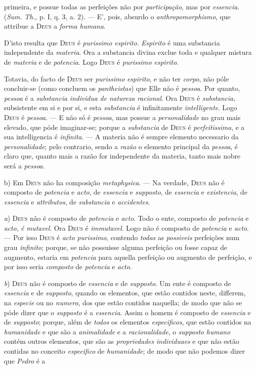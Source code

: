 primeira, e possue todas as perfeições não por \emph{participação}, mas por \emph{essencia}. (\emph{Sum. Th.}, p. I, q. 3, a. 2). --- E', pois, absurdo o \emph{anthropomorphismo}, que attribue a \textsc{Deus} a \emph{forma humana}.\par D'isto resulta que \textsc{Deus} é \emph{purissimo espirito}. \emph{Espirito} é uma substancia independente da \emph{materia}. Ora a substancia divina exclue toda e qualquer mistura de \emph{materia} e de \emph{potencia}. Logo \textsc{Deus} é \emph{purissimo espirito}.\par Totavia, do facto de \textsc{Deus} ser \emph{purissimo espirito}, e não ter \emph{corpo}, não póle concluir-se (como concluem os \emph{pantheistas}) que Elle não é \emph{pessoa}. Por quanto, \emph{pessoa} é a \emph{substancia individua de natureza racional}. Ora \textsc{Deus} é \emph{substancia}, subsistente em si e por si, e esta \emph{substancia} é infinitamente \emph{intelligente}. Logo \textsc{Deus} é \emph{pessoa}. --- E não só é \emph{pessoa}, mas possue a \emph{persona}\emph{lidade} no grau mais elevado, que póde imaginar-se; porque a \emph{substancia} de \textsc{Deus} é \emph{perfeitissima}, e a sua intelligencia é \emph{infinita}. --- A materia não é sempre elemento necessario da \emph{personalidade}; pelo contrario, sendo a \emph{razão} o elemento principal da \emph{pessoa}, é claro que, quanto mais a razão for independente da materia, tanto mais nobre será a \emph{pessoa}.\par b) Em \textsc{Deus} não ha composição \emph{metaphysica}. --- Na verdade, \textsc{Deus} não é composto de \emph{potencia} e \emph{acto}, de \emph{essencia} e \emph{supposto}, de \emph{essencia} e \emph{existencia}, de \emph{essencia} e \emph{attributos}, de \emph{substancia} e \emph{accidentes}.\par \emph{a}) \textsc{Deus} não é composto de \emph{potencia} e \emph{acto}. Todo o ente, composto de \emph{potencia} e \emph{acto}, \emph{é mutavel}. Ora \textsc{Deus} é \emph{immutavel}. Logo não é composto de \emph{potencia} e \emph{acto}. --- Por isso \textsc{Deus} é \emph{acto purissimo}, contendo \emph{todas} as \emph{possiveis} perfeições num grau \emph{infinito}; porque, se não possuisse alguma perfeição ou fosse capaz de augmento, estaria em \emph{potencia} para aquella perfeição ou augmento de perfeição, e por isso seria \emph{composto} de \emph{potencia} e \emph{acto}.\par \emph{b}) \textsc{Deus} não é composto de \emph{essencia} e de \emph{supposto}. Um ente é composto de \emph{essencia} e de \emph{supposto}, quando os elementos, que estão contidos neste, differem, na \emph{especie} ou no \emph{numero}, dos que estão contidos naquella; de modo que não se póde dizer que o \emph{supposto} é a \emph{essencia}. Assim o homem é composto de \emph{essencia} e de \emph{supposto}; porque, além de \emph{todos} os elementos \emph{especificos}, que estão contidos na \emph{humanidade} e que são a \emph{animalidade} e a \emph{racionalidade}, o \emph{supposto humano} contém outros elementos, que são as \emph{propriedades individuaes} e que não estão contidas no conceito \emph{especifico} de \emph{humanidade}; de modo que não podemos dizer que \emph{Pedro} é a 